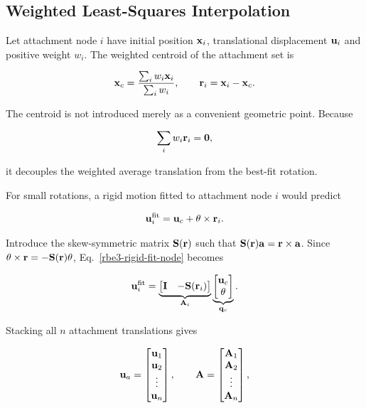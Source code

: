 \subsection{Weighted Least-Squares Interpolation}

Let attachment node $i$ have initial position $\mathbf{x}_i$, translational
displacement $\mathbf{u}_i$ and positive weight $w_i$. The weighted centroid of the
attachment set is

\begin{equation}\label{rbe3-weighted-centroid}
    \mathbf{x}_c = \frac{\sum_i w_i\mathbf{x}_i}{\sum_i w_i},
    \qquad
    \mathbf{r}_i=\mathbf{x}_i-\mathbf{x}_c.
\end{equation}

The centroid is not introduced merely as a convenient geometric point. Because

\begin{equation}
    \sum_i w_i\mathbf{r}_i=\mathbf{0},
\end{equation}

it decouples the weighted average translation from the best-fit rotation.

For small rotations, a rigid motion fitted to attachment node $i$ would predict

\begin{equation}\label{rbe3-rigid-fit-node}
    \mathbf{u}_i^{\mathrm{fit}}
    =\mathbf{u}_c+\mathbf{\theta}\times\mathbf{r}_i.
\end{equation}

Introduce the skew-symmetric matrix $\mathbf{S}(\mathbf{r})$ such that
$\mathbf{S}(\mathbf{r})\mathbf{a}=\mathbf{r}\times\mathbf{a}$. Since
$\mathbf{\theta}\times\mathbf{r}=-\mathbf{S}(\mathbf{r})\mathbf{\theta}$,
Eq.~\eqref{rbe3-rigid-fit-node} becomes

\begin{equation}
    \mathbf{u}_i^{\mathrm{fit}}
    =\underbrace{\begin{bmatrix}
        \mathbf{I}&-\mathbf{S}(\mathbf{r}_i)
    \end{bmatrix}}_{\mathbf{A}_i}
    \underbrace{\begin{bmatrix}
        \mathbf{u}_c\\\mathbf{\theta}
    \end{bmatrix}}_{\mathbf{q}_c}.
\end{equation}

Stacking all $n$ attachment translations gives

\begin{equation}
    \mathbf{u}_a=\begin{bmatrix}
        \mathbf{u}_1\\\mathbf{u}_2\\\vdots\\\mathbf{u}_n
    \end{bmatrix},
    \qquad
    \mathbf{A}=\begin{bmatrix}
        \mathbf{A}_1\\\mathbf{A}_2\\\vdots\\\mathbf{A}_n
    \end{bmatrix},
\end{equation}

